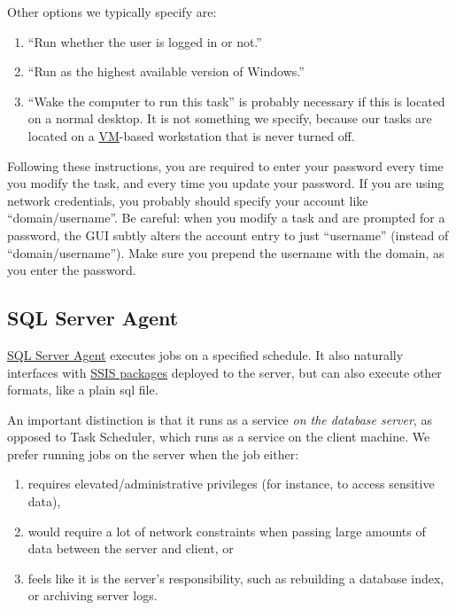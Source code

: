 \documentclass[
]{book}
\providecommand{\tightlist}{%
  \setlength{\itemsep}{0pt}\setlength{\parskip}{0pt}}
\begin{document}
Other options we typically specify are:

\begin{enumerate}
\def\labelenumi{\arabic{enumi}.}
\tightlist
\item
  ``Run whether the user is logged in or not.''
\item
  ``Run as the highest available version of Windows.''
\item
  ``Wake the computer to run this task'' is probably necessary if this is located on a normal desktop. It is not something we specify, because our tasks are located on a \href{https://en.wikipedia.org/wiki/System_virtual_machine}{VM}-based workstation that is never turned off.
\end{enumerate}

Following these instructions, you are required to enter your password every time you modify the task, and every time you update your password. If you are using network credentials, you probably should specify your account like ``domain/username''. Be careful: when you modify a task and are prompted for a password, the GUI subtly alters the account entry to just ``username'' (instead of ``domain/username''). Make sure you prepend the username with the domain, as you enter the password.

\hypertarget{automation-sql-server-agent}{%
\subsection{SQL Server Agent}\label{automation-sql-server-agent}}

\href{https://docs.microsoft.com/en-us/sql/ssms/agent/sql-server-agent}{SQL Server Agent} executes jobs on a specified schedule. It also naturally interfaces with \protect\hyperlink{automation-ssis}{SSIS packages} deployed to the server, but can also execute other formats, like a plain sql file.

An important distinction is that it runs as a service \emph{on the database server}, as opposed to Task Scheduler, which runs as a service on the client machine. We prefer running jobs on the server when the job either:

\begin{enumerate}
\def\labelenumi{\arabic{enumi}.}
\tightlist
\item
  requires elevated/administrative privileges (for instance, to access sensitive data),
\item
  would require a lot of network constraints when passing large amounts of data between the server and client, or
\item
  feels like it is the server's responsibility, such as rebuilding a database index, or archiving server logs.
\end{enumerate}
\end{document}
